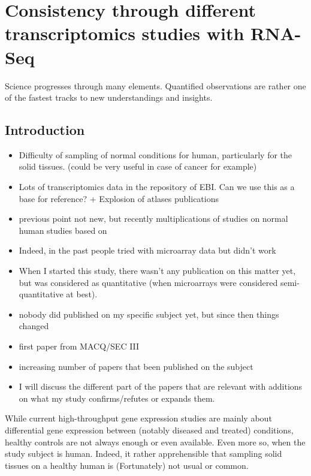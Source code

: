 \chapter{Consistency through different transcriptomics studies with RNA-Seq}
\label{ch:Transcriptomics}



Science progresses through many elements. Quantified observations are rather one
of the fastest tracks to new understandings and insights.

\section{Introduction}

\begin{itemize}
    \item Difficulty of sampling of normal conditions for human, particularly
        for the solid tissues. (could be very useful in case of cancer for
        example)
    \item Lots of transcriptomics data in the repository of EBI. Can we use
        this as a base for reference? + Explosion of atlases publications
    \item previous point not new, but recently multiplications of studies on
        normal human studies based on \Rnaseq
    \item Indeed, in the past people tried with microarray data but didn't work
    \item When I started this study, there wasn't any publication on this matter
        yet, but \Rnaseq was considered as quantitative (when microarrays were
        considered semi-quantitative at best).
    \item nobody did published on my specific subject yet, but since then things changed
    \item first paper from MACQ/SEC III
    \item increasing number of papers that been published on the subject
    \item I will discuss the different part of the papers that are relevant
        with additions on what my study confirms/refutes or expands them.
\end{itemize}


While current high-throughput gene expression studies are mainly about
differential gene expression between (notably diseased and treated) conditions,
healthy controls are not always enough or even available. Even more so, when the
study subject is human. Indeed, it rather apprehensible that sampling solid
tissues on a healthy human is (Fortunately) not usual or common.

